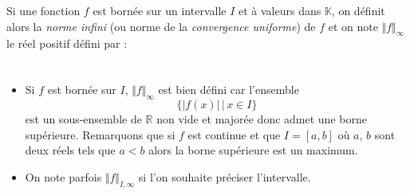 \documentclass[a4paper,10pt]{report}
\begin{document}


\begin{Definition}{} Si une fonction $f$ est bornée sur un intervalle $I$ et à valeurs dans $\mathbb{K}$, on définit alors la \emph{norme infini} (ou norme de la \emph{convergence uniforme}) de $f$ et on note $\Vert f \Vert_{\infty}$ le réel positif défini par :
$$ \phantom{\Vert f \Vert_{\infty} = \sup_{x \in I} \vert f(x) \vert} $$
\end{Definition}

\begin{Remarques}{}
\begin{itemize} 
\item Si $f$ est bornée sur $I$, $\Vert f \Vert_{\infty}$ est bien défini car l'ensemble 
$$ \lbrace \vert f(x) \vert \, \vert \, x \in I \rbrace$$
est un sous-ensemble de $\mathbb{R}$ non vide et majorée donc admet une borne supérieure. Remarquons que si $f$ est continue et que $I= [a,b]$ où $a$, $b$ sont deux réels tels que $a<b$ alors la borne supérieure est un maximum.
\item On note parfois $\Vert f \Vert_{I,\infty}$ si l'on souhaite préciser l'intervalle.
\end{itemize}
\end{Remarques}{} 
\end{document}
